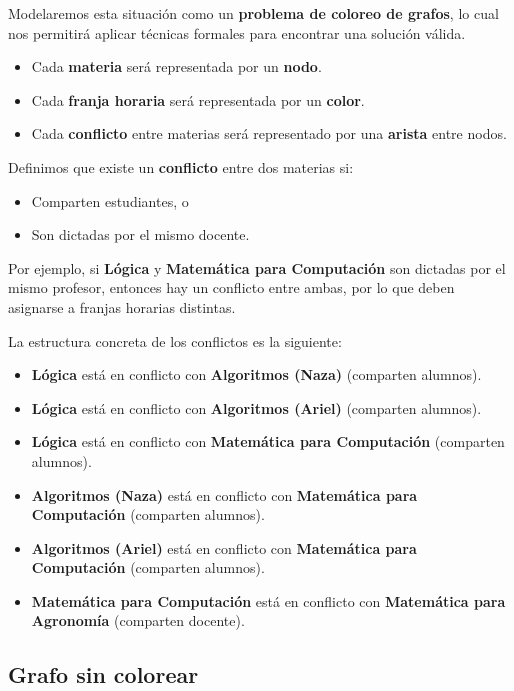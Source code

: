 \documentclass[a4paper,11pt]{article}
\begin{document}
Modelaremos esta situación como un \textbf{problema de coloreo de grafos}, lo cual nos permitirá aplicar técnicas formales para encontrar una solución válida.

\begin{itemize}
    \item Cada \textbf{materia} será representada por un \textbf{nodo}.
    \item Cada \textbf{franja horaria} será representada por un \textbf{color}.
    \item Cada \textbf{conflicto} entre materias será representado por una \textbf{arista} entre nodos.
\end{itemize}

Definimos que existe un \textbf{conflicto} entre dos materias si:
\begin{itemize}
    \item Comparten estudiantes, o
    \item Son dictadas por el mismo docente.
\end{itemize}

Por ejemplo, si \textbf{Lógica} y \textbf{Matemática para Computación} son dictadas por el mismo profesor, entonces hay un conflicto entre ambas, por lo que deben asignarse a franjas horarias distintas.

La estructura concreta de los conflictos es la siguiente:
\begin{itemize}
    \item \textbf{Lógica} está en conflicto con \textbf{Algoritmos (Naza)} (comparten alumnos).
    \item \textbf{Lógica} está en conflicto con \textbf{Algoritmos (Ariel)} (comparten alumnos).
    \item \textbf{Lógica} está en conflicto con \textbf{Matemática para Computación} (comparten alumnos).
    \item \textbf{Algoritmos (Naza)} está en conflicto con \textbf{Matemática para Computación} (comparten alumnos).
    \item \textbf{Algoritmos (Ariel)} está en conflicto con \textbf{Matemática para Computación} (comparten alumnos).
    \item \textbf{Matemática para Computación} está en conflicto con \textbf{Matemática para Agronomía} (comparten docente).
\end{itemize}

\newpage

\subsection{Grafo sin colorear}
\end{document}
